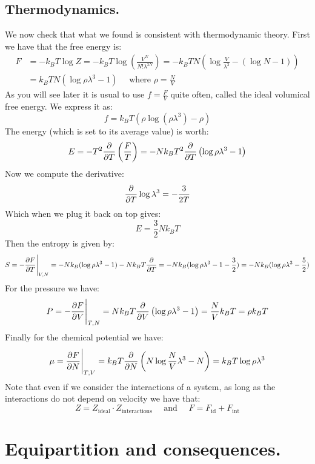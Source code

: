 \documentclass[10pt,a4paper]{book}
\begin{document}
\subsection{Thermodynamics.}
We now check that what we found is consistent with thermodynamic theory. First we have that the free energy is:
\begin{align*}
F &= -k_B T \log Z = -k_B T\log(\frac{V^N}{N! \lambda^{3N}}) = - k_B T N \left(\log \frac{V}{\lambda^3} - (\log N - 1) \right) \\
&= k_B T N (\log \rho \lambda^3 - 1) \quad \text{ where } \rho = \frac{N}{V}
\end{align*}
As you will see later it is usual to use $f = \frac{F}{V}$ quite often, called the ideal volumical free energy. We express it as:
\[
f = k_B T \left(\rho \log (\rho \lambda^3) - \rho\right)
\]
The energy (which is set to its average value) is worth:
\[
E = -T^2 \pdv{}{T} \left(\frac{F}{T}\right) = - N k_B T^2 \pdv{}{T} \left(\log \rho \lambda^3 - 1\right)
\]
Now we compute the derivative:
\[
\pdv{}{T} \log \lambda^3 = -\frac{3}{2T}
\]
Which when we plug it back on top gives:
\[
E = \frac{3}{2} N k_B T
\]
Then the entropy is given by:
\[
S = - \pdv{F}{T}\Bigg|_{V, N} = - N k_B (\log \rho \lambda^3 - 1) - N k_B T \pdv{}{T} (\log \rho \lambda^3 - 1) = - N k_B (\log \rho \lambda^3 - 1 - \frac{3}{2}) = - N k_B (\log \rho \lambda^3 - \frac{5}{2})
\]
For the pressure we have:
\[
P = -\pdv{F}{V}\Bigg|_{T, N} = Nk_B T \pdv{}{V} \left(\log \rho \lambda^3 - 1\right) = \frac{N}{V} k_B T = \rho k_B T
\]
Finally for the chemical potential we have:
\[
\mu = \pdv{F}{N}\Bigg|_{T, V} = k_B T \pdv{}{N} \left(N \log \frac{N}{V}\lambda^3 - N \right) = k_B T \log \rho \lambda^3
\]
Note that even if we consider the interactions of a system, as long as the interactions do not depend on velocity we have that:
\[
Z = Z_\text{ideal} \cdot Z_\text{interactions} \quad \text{ and } \quad F = F_\text{id} + F_\text{int}
\]

\section{Equipartition and consequences.}
\end{document}
